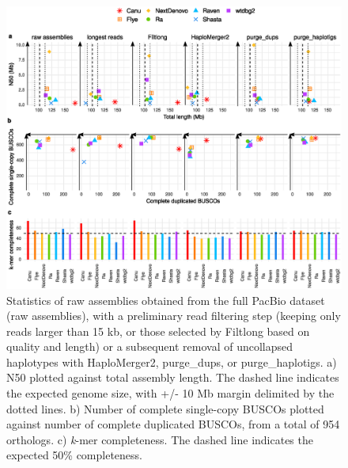    \begin{figure}[ht]
    \centering
     \includegraphics[width=13.5cm]{fig/benchmark/pacbio_all_v20210317.eps}
   \caption{Statistics of raw assemblies obtained from the full PacBio dataset (raw assemblies), with a preliminary read filtering step (keeping only reads larger than 15 kb, or those selected by Filtlong based on quality and length) or a subsequent removal of uncollapsed haplotypes with HaploMerger2, purge\_dups, or purge\_haplotigs. a) N50 plotted against total assembly length. The dashed line indicates the expected genome size, with +/- 10 Mb margin delimited by the dotted lines. b) Number of complete single-copy BUSCOs plotted against number of complete duplicated BUSCOs, from a total of 954 orthologs. c) \textit{k}-mer completeness. The dashed line indicates the expected 50\% completeness.}
   \label{fig:pacbio_full_stats}
 \end{figure}
 
